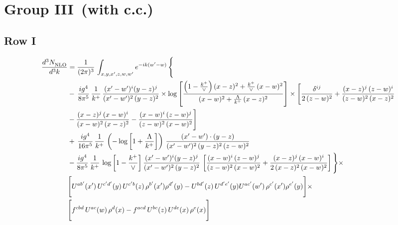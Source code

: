 \documentclass[9pt]{article}
\numberwithin{equation}{section}
\begin{document}
\section{Group III\, (with c.c.)}
\subsection{Row I}
\begin{align}
     \frac{d^{3}N_{\rm NLO}^{\rm}}{d^{3}k}  & =  \frac{1}{(2\pi)^{3}}\, \int_{x,y,x',z,w,w^{\prime}} e^{-ik(w^{\prime}-w)}\, \Bigg\{\notag \\ & -\,\frac{ig^{4}}{8\pi^{5}}\,\frac{1}{k^{+}}\,\frac{(x'-w')^{i}(y-z)^{j}}{(x'-w')^{2}\,(y-z)^{2}}\times \log{\left[\frac{\left(1-\frac{k^{+}}{\vee}\right)(x-z)^{2}+\frac{k^{+}}{\vee}\,(x-w)^{2}}{(x-w)^{2}+\frac{\Lambda}{k^{+}}\,(x-z)^{2}}\right]}\times \Bigg[\frac{\delta^{ij}}{2\,(z-w)^{2}}+\frac{(x-z)^{j}\,(z-w)^{i}}{(z-w)^{2}\,(x-z)^{2}}\notag \\ & -\frac{(x-z)^{j}\,(x-w)^{i}}{(x-w)^{2}\,(x-z)^{2}}-\frac{(x-w)^{i}\,(z-w)^{j}}{(z-w)^{2}\,(x-w)^{2}}\Bigg]\notag \\ & +\,\frac{ig^{4}}{16\pi^{5}}\,\frac{1}{k^{+}}\,\left(-\log{\left[1+\frac{\Lambda}{k^{+}}\right]}\right)\, \frac{(x'-w')\cdot (y-z)}{(x'-w')^{2}\,(y-z)^{2}\,(z-w)^{2}}\notag \\ & -\frac{ig^{4}}{8\pi^{5}}\,\frac{1}{k^{+}}\, \log{\left[1-\frac{k^{+}}{\vee}\right]}\,\frac{(x'-w')^{i}(y-z)^{j}}{(x'-w')^{2}\,(y-z)^{2}}\,\left[\frac{(x-w)^{i}\,(z-w)^{j}}{(z-w)^{2}\,(x-w)^{2}}+\frac{(x-z)^{j}\,(x-w)^{i}}{2\,(x-z)^{2}\, (x-w)^{2}}\right]\Bigg\}\times \notag \\ &  \Bigg[U^{ab'}(x')\,U^{c'd'}(y)\,U^{c'b}(z)\,\rho^{b'}(x')\rho^{d'}(y)-U^{bd'}(z)\,U^{d'e'}(y)U^{ac'}(w')\,\rho^{c'}(x')\rho^{e'}(y)\Bigg]\times\notag \\ & \Bigg[f^{cbd}\,U^{ac}(w)\,\rho^{d}(x)-f^{acd}\, U^{bc}(z)\,U^{de}(x)\,\rho^{e}(x)\Bigg] 
\end{align}
\end{document}
